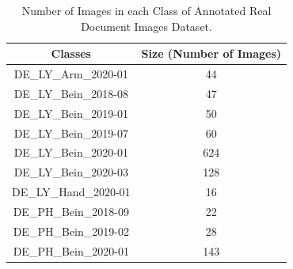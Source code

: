 \begin{center}
    \begin{table}[H]
    \begin{center}
    \begin{tabular}{||c c||} 
    \hline
    \textbf{Classes} & \textbf{Size (Number of Images)}\\ [0.5ex] 
    \hline\hline
    DE\_LY\_Arm\_2020-01 & 44 \\ 
    \hline
    DE\_LY\_Bein\_2018-08 & 47 \\
    \hline
    DE\_LY\_Bein\_2019-01 & 50 \\
    \hline
    DE\_LY\_Bein\_2019-07&  60\\
    \hline
    DE\_LY\_Bein\_2020-01&  624\\
    \hline
    DE\_LY\_Bein\_2020-03&  128\\
    \hline
    DE\_LY\_Hand\_2020-01&  16\\
    \hline
    DE\_PH\_Bein\_2018-09&  22\\
    \hline
    DE\_PH\_Bein\_2019-02&  28\\
    \hline    
    DE\_PH\_Bein\_2020-01&  143\\
    \hline    
    \end{tabular}
    \end{center}
    \caption[Number of Images in each Class of Annotated Real Document Images Dataset.]{Number of Images in each Class of Annotated Real Document Images Dataset.}
    \label{table:testdataset}
    \end{table}
\end{center}



